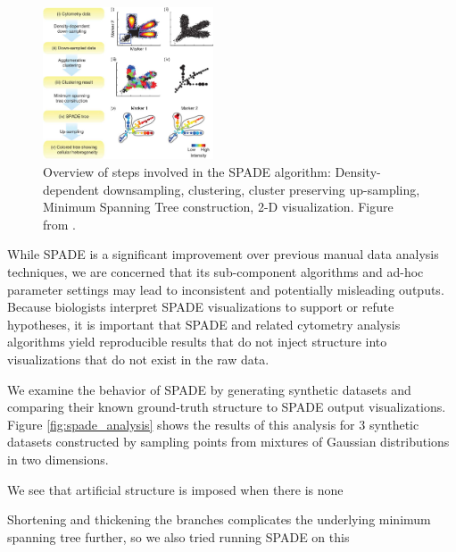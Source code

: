 \documentclass{article}
\begin{document}
\begin{figure}
\begin{center}
\includegraphics[width=0.45\textwidth]{Figures/SPADE-flowchart.jpg}
\end{center}
\caption{Overview of steps involved in the SPADE algorithm: Density-dependent downsampling, clustering, cluster preserving up-sampling, Minimum Spanning Tree construction, 2-D visualization.  Figure from \cite{}. }
\label{fig:spade_overview}
\end{figure}


While SPADE is a significant improvement over previous manual data analysis techniques, 
we are concerned that its  sub-component algorithms and ad-hoc parameter settings may lead to inconsistent and potentially misleading outputs.  Because biologists interpret SPADE visualizations to support or refute hypotheses, it is important that SPADE and related cytometry analysis algorithms  yield reproducible results that do not  inject structure into visualizations that do not exist in the raw data. 

We examine the behavior of SPADE by generating synthetic datasets and comparing their known ground-truth structure to SPADE output visualizations.  Figure \ref{fig:spade_analysis} shows the results of this analysis for 3 synthetic datasets constructed by sampling points from  mixtures of Gaussian distributions in two dimensions.%
 
We see that artificial structure is imposed when there is none

Shortening and thickening the branches complicates the underlying minimum spanning tree further, so we also tried running SPADE on this
\end{document}
